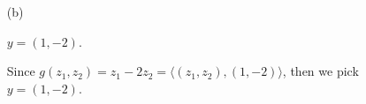\begin{Exercise}
\begin{enumerate}[(a)]
\item[(b)]
\begin{answer}
$y = (1,-2)$.
\end{answer}
\begin{solution}
Since $g(z_1,z_2) = z_1-2z_2 = \langle (z_1,z_2),(1,-2) \rangle$, then we pick $y = (1,-2)$.
\end{solution}
\end{enumerate}
\end{Exercise}